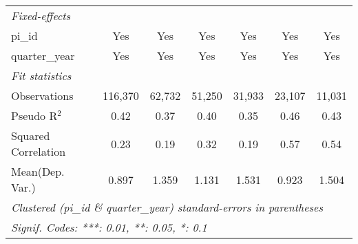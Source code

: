 \begin{tabular}{lcccccc}
   \emph{Fixed-effects}\\
   pi\_id                                                     & Yes            & Yes           & Yes            & Yes           & Yes           & Yes\\  
   quarter\_year                                              & Yes            & Yes           & Yes            & Yes           & Yes           & Yes\\  
   \midrule
   \emph{Fit statistics}\\
   Observations                                               & 116,370        & 62,732        & 51,250         & 31,933        & 23,107        & 11,031\\  
   Pseudo R$^2$                                               & 0.42           & 0.37          & 0.40           & 0.35          & 0.46          & 0.43\\  
   Squared Correlation                                        & 0.23           & 0.19          & 0.32           & 0.19          & 0.57          & 0.54\\  
Mean(Dep. Var.) & 0.897 & 1.359 & 1.131 & 1.531 & 0.923 & 1.504 \\
   \midrule \midrule
   \multicolumn{7}{l}{\emph{Clustered (pi\_id \& quarter\_year) standard-errors in parentheses}}\\
   \multicolumn{7}{l}{\emph{Signif. Codes: ***: 0.01, **: 0.05, *: 0.1}}\\
\end{tabular}
\par\endgroup
